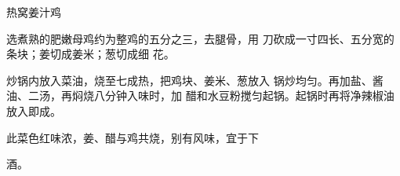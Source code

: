 \begin{recipe}{热窝姜汁鸡}

\ingredients


\cooking

\step 选煮熟的肥嫩母鸡约为整鸡的五分之三，去腿骨，用 刀砍成一寸四长、五分宽的条块；姜切成姜米；葱切成细 花。

\step 炒锅内放入菜油，烧至七成热，把鸡块、姜米、葱放入 锅炒均匀。再加盐、酱油、二汤，再焖烧八分钟入味时，加 醋和水豆粉搅匀起锅。起锅时再将净辣椒油放入即成。

\notes

此菜色红味浓，姜、醋与鸡共烧，别有风味，宜于下

酒。

\end{recipe}

